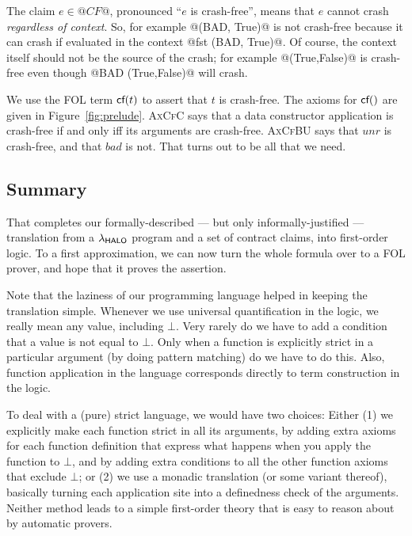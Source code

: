 The claim $e \in @CF@$, pronounced ``$e$ is crash-free'', means that $e$ cannot
crash \emph{regardless of context}.  So, for example @(BAD, True)@ is not crash-free
because it can crash if evaluated in the context @fst (BAD, True)@.  Of course,
the context itself should not be the source of the crash; for example @(True,False)@ is
crash-free even though @BAD (True,False)@ will crash.

We use the FOL term $\textsf{cf}(t)$ to assert that $t$ is crash-free. The axioms for $\textsf{cf}()$
are given in Figure~\ref{fig:prelude}.  \textsc{AxCfC} says that a data constructor application
is crash-free if and only iff its arguments are crash-free.  \textsc{AxCfBU} says that
$unr$ is crash-free, and that $bad$ is not.  That turns out to be all that we need.

\subsection{Summary}

That completes our formally-described --- but only informally-justified --- translation
from a $\lambda_{\sf HALO}$ program and a set of contract claims, into first-order logic.
To a first approximation, we can now turn the whole formula over to a FOL prover,
and hope that it proves the assertion.

Note that the laziness of our programming language helped in keeping the translation simple. Whenever we use universal quantification in the logic, we really mean any value, including $\bot$. Very rarely do we have to add a condition that
a value is not equal to $\bot$. Only when a function is explicitly strict in a particular argument (by doing pattern matching) do we have to do this. Also, function application in the language corresponds directly to term construction in the logic.

To deal with a (pure) strict language, we would have two choices: Either (1) we explicitly make each function strict in all its arguments, by adding extra axioms for each function definition that express what happens when you apply the function to $\bot$, and by adding extra conditions to all the other function axioms that exclude $\bot$; or (2) we use a monadic translation (or some variant thereof), basically turning each application site into a definedness check of the arguments. Neither method leads to a simple first-order theory that is easy to reason about by automatic provers.


